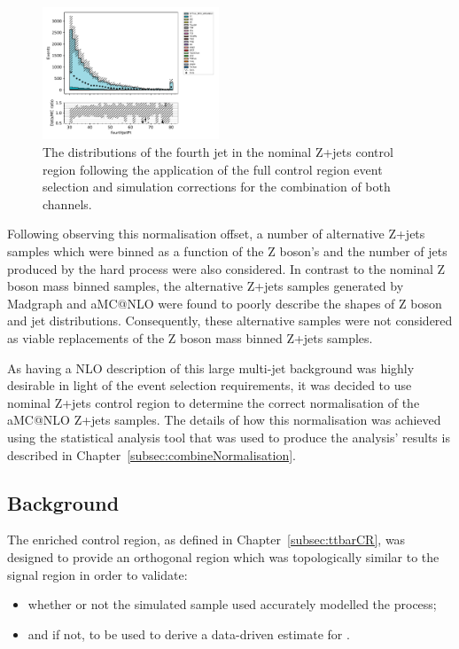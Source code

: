 \begin{figure}[tbp]
\centering
\includegraphics[width=0.47\textwidth]{figs/tzq-fullSelection-plots/plots_ee_zPlus/fourthJetPt.pdf}
\caption{
The distributions of the fourth jet \pt in the nominal Z+jets control region following the application of the full control region event selection and simulation corrections for the combination of both channels.
}
\label{fig:zPlusCR_fourthJetPt}
\end{figure}

Following observing this normalisation offset, a number of alternative Z+jets samples which were binned as a function of the Z boson's \pT and the number of jets produced by the hard process were also considered.
In contrast to the nominal Z boson mass binned samples, the alternative Z+jets samples generated by Madgraph and aMC@NLO were found to poorly describe the shapes of Z boson and jet distributions.
Consequently, these alternative samples were not considered as viable replacements of the Z boson mass binned Z+jets samples.

As having a NLO description of this large multi-jet background was highly desirable in light of the event selection requirements, it was decided to use nominal Z+jets control region to determine the correct normalisation of the aMC@NLO Z+jets samples.
The details of how this normalisation was achieved using the statistical analysis tool that was used to produce the analysis' results is described in Chapter~\ref{subsec:combineNormalisation}.

\subsection{\ttbar Background}\label{subsec:ttbarEstimation}
The \ttbar enriched control region, as defined in Chapter~\ref{subsec:ttbarCR}, was designed to provide an orthogonal region which was topologically similar to the signal region in order to validate:
\begin{itemize}
\item whether or not the simulated \ttbar sample used accurately modelled the \ttbar process;
\item and if not, to be used to derive a data-driven estimate for \ttbar.
\end{itemize}

